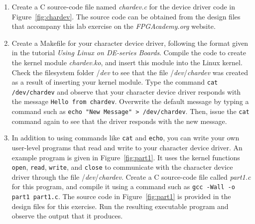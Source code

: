 \documentclass[epsfig,10pt,fullpage]{article}
\begin{document}
\begin{enumerate}
\item Create a C source-code file named {\it chardev.c} for the device driver code in 
Figure~\ref{fig:chardev}. The source code can be obtained from the design files that
accompany this lab exercise on the {\it FPGAcademy.org} website. 
\item Create a Makefile for your character device driver, following the format given in
the tutorial {\it Using Linux on DE-series Boards}. Compile the code to create the kernel module 
{\it chardev.ko}, and insert this module into the Linux kernel. 
Check the filesystem folder /{\it dev} to see that the file /{\it dev}/{\it chardev} was
created as a result of inserting your kernel module. Type the command \texttt{cat
/dev/chardev} and observe that your character device driver responds with the message
\texttt{Hello from chardev}. Overwrite the default message by typing a command such as
\texttt{echo "New Message" > /dev/chardev}. Then, issue the \texttt{cat} command again to
see that the driver responds with the new message.
\item
In addition to using commands like \texttt{cat} and \texttt{echo}, you can write your own
user-level programs that read and write to your character device driver. An example program 
is given in Figure~\ref{fig:part1}. It uses the kernel functions \texttt{open}, \texttt{read},
\texttt{write}, and \texttt{close} to communicate with the character device driver through
the file /{\it dev}/{\it chardev}. Create a C source-code file called {\it part1.c} for
this program, and compile it using a command such as \texttt{gcc -Wall -o part1 part1.c}.
The source code in Figure~\ref{fig:part1} is provided in the design files for this exercise.
Run the resulting executable program and observe the output that it produces.
\end{enumerate}
\end{document}

